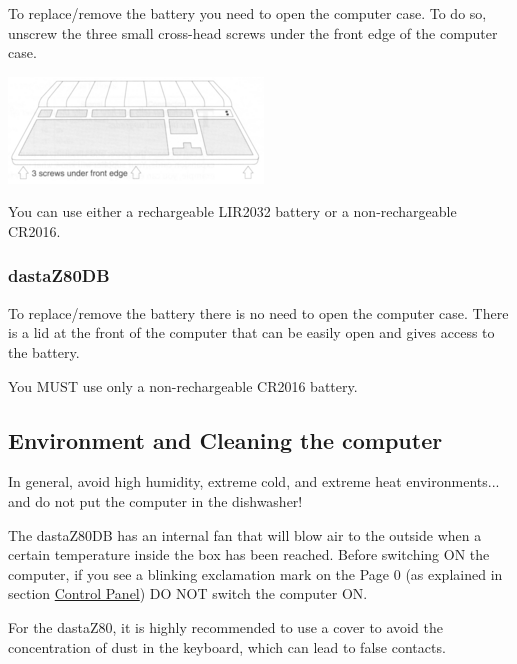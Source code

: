         To replace/remove the battery you need to open the computer case. To do
        so, unscrew the three small cross-head screws under the front edge of
        the computer case.

        \centerline{\includegraphics[scale=1]{images/keyboardscrews.png}}

        You can use either a rechargeable LIR2032 battery or a non-rechargeable
        CR2016.

        \subsubsection{dastaZ80DB}

        To replace/remove the battery there is no need to open the computer case.
        There is a lid at the front of the computer that can be easily open and
        gives access to the battery.

        You MUST use only a non-rechargeable CR2016 battery.

    \subsection{Environment and Cleaning the computer}

    In general, avoid high humidity, extreme cold, and extreme heat
    environments... and do not put the computer in the dishwasher!

    The dastaZ80DB has an internal fan that will blow air to the outside when a
    certain temperature inside the box has been reached. Before switching ON the
    computer, if you see a blinking exclamation mark on the Page 0 (as explained
    in section \hyperref[subsubsec:controlpanel]{Control Panel}) DO NOT switch
    the computer ON.

    For the dastaZ80, it is highly recommended to use a cover to avoid the
    concentration of dust in the keyboard, which can lead to false contacts.